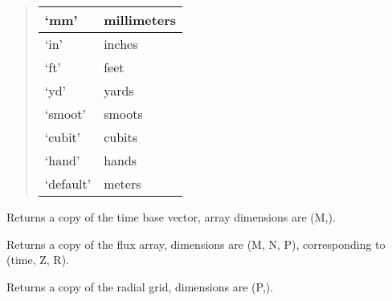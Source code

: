 \documentclass[letterpaper,10pt,english]{sphinxmanual}
\begin{document}
\begin{fulllineitems}
\begin{quote}
\begin{description}
\begin{tabulary}{\linewidth}{|L|L|}
`mm'
 & 
millimeters
\\\hline

`in'
 & 
inches
\\\hline

`ft'
 & 
feet
\\\hline

`yd'
 & 
yards
\\\hline

`smoot'
 & 
smoots
\\\hline

`cubit'
 & 
cubits
\\\hline

`hand'
 & 
hands
\\\hline

`default'
 & 
meters
\\\hline
\end{tabulary}


\end{description}\end{quote}

\begin{fulllineitems}
\label{eqtools:eqtools.FromArrays.ArrayEquilibrium.getTimeBase}
Returns a copy of the time base vector, array dimensions are (M,).

\end{fulllineitems}


\begin{fulllineitems}
\label{eqtools:eqtools.FromArrays.ArrayEquilibrium.getFluxGrid}
Returns a copy of the flux array, dimensions are (M, N, P), corresponding to (time, Z, R).

\end{fulllineitems}


\begin{fulllineitems}
\label{eqtools:eqtools.FromArrays.ArrayEquilibrium.getRGrid}
Returns a copy of the radial grid, dimensions are (P,).

\end{fulllineitems}



\end{fulllineitems}
\end{document}
